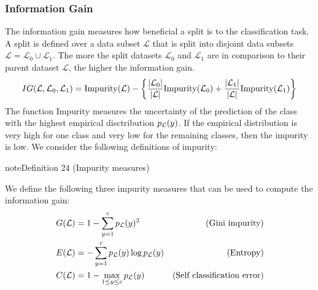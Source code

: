 \documentclass[letterpaper,10pt,english]{jupyterBook}
\begin{document}
\subsubsection{Information Gain}
\label{\detokenize{classification_decision_trees:information-gain}}
\sphinxAtStartPar
The information gain measures how beneficial a split is to the classification task. A split is defined over a data sub\sphinxhyphen{}set \(\mathcal{L}\) that is split into disjoint data sub\sphinxhyphen{}sets \(\mathcal{L}=\mathcal{L}_0\cup\mathcal{L}_1\).  The more  the split datasets \(\mathcal{L}_0\) and \(\mathcal{L}_1\) are in comparison to their parent dataset \(\mathcal{L}\), the higher the information gain.
\begin{equation}\label{equation:classification_decision_trees:information_gain}
\begin{split}IG(\mathcal{L},{\cal L}_0, {\cal L}_1) = \mathrm{Impurity}({\cal L}) - \left\{ \frac{\lvert {\cal L}_0\rvert}{\lvert{\cal L}\rvert} \mathrm{Impurity}({\cal L}_0) + \frac{\lvert{\cal L}_1\rvert}{\lvert{\cal L}\rvert} \mathrm{Impurity}({\cal L}_{1}) \right\} \end{split}
\end{equation}
\sphinxAtStartPar
The function \(\mathrm{Impurity}\) measures the uncertainty of the prediction of the class with the highest empirical disctribution \(p_{\cal L}(y)\). If the empirical distribution is very high for one class and very low for the remaining classes, then the impurity is low. We consider the following definitions of impurity:
\label{classification_decision_trees:definition-4}
\begin{sphinxadmonition}{note}{Definition 24 (Impurity measures)}



\sphinxAtStartPar
We define the following three impurity measures that can be used to compute the information gain:
\begin{align*}
G({\cal L}) & = 1 - \sum_{y=1}^c p_{\cal L}(y)^{2} &\text{ (Gini impurity)}\\
E({\cal L}) &= - \sum_{y =1}^c p_{\cal L}(y) \log p_{\cal L}(y) &\text{ (Entropy)}\\
C({\cal L}) &= 1 - \max_{1\leq y \leq c} p_{\cal L}(y) &\text{(Self classification error)}
\end{align*}\end{sphinxadmonition}
\end{document}
